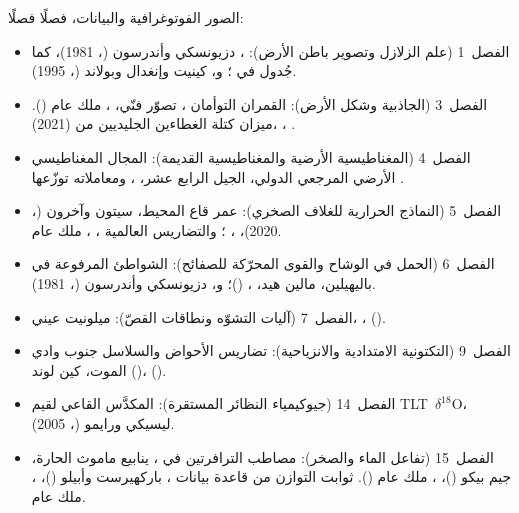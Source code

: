 \bigskip
\noindent الصور الفوتوغرافية والبيانات، فصلًا فصلًا:
\begin{itemize}\small
  \item الفصل~1 (علم الزلازل وتصوير باطن الأرض): ، دزيونسكي وأندرسون (، 1981)، كما جُدول في ؛ و، كينيت وإنغدال وبولاند (، 1995).
  \item الفصل~3 (الجاذبية وشكل الأرض): القمران التوأمان ، تصوّر فنّي، ، ملك عام (). ميزان كتلة الغطاءين الجليديين من  (2021)، ، .
  \item الفصل~4 (المغناطيسية الأرضية والمغناطيسية القديمة): المجال المغناطيسي الأرضي المرجعي الدولي، الجيل الرابع عشر، ، ومعاملاته توزّعها .
  \item الفصل~5 (النماذج الحرارية للغلاف الصخري): عمر قاع المحيط، سيتون وآخرون (، 2020)، ، ؛ والتضاريس العالمية ، ، ملك عام.
  \item الفصل~6 (الحمل في الوشاح والقوى المحرّكة للصفائح): الشواطئ المرفوعة في باليهيلين، مالين هيد، ،  ()؛ و، دزيونسكي وأندرسون (، 1981).
  \item الفصل~7 (آليات التشوّه ونطاقات القصّ): ميلونيت عيني، ،  ().
  \item الفصل~9 (التكتونية الامتدادية والانزياحية): تضاريس الأحواض والسلاسل جنوب وادي الموت، كين لوند ()،  ().
  \item الفصل~14 (جيوكيمياء النظائر المستقرة): المكدَّس القاعي  لقيم \mbox{\textdir TLT $\delta^{18}$O}، ليسيكي ورايمو (، 2005).
  \item الفصل~15 (تفاعل الماء والصخر): مصاطب الترافرتين في ، ينابيع ماموث الحارة، جيم بيكو ()، ، ملك عام (). ثوابت التوازن من قاعدة بيانات ، باركهيرست وأبيلو ()، ، ملك عام.

\end{itemize}
